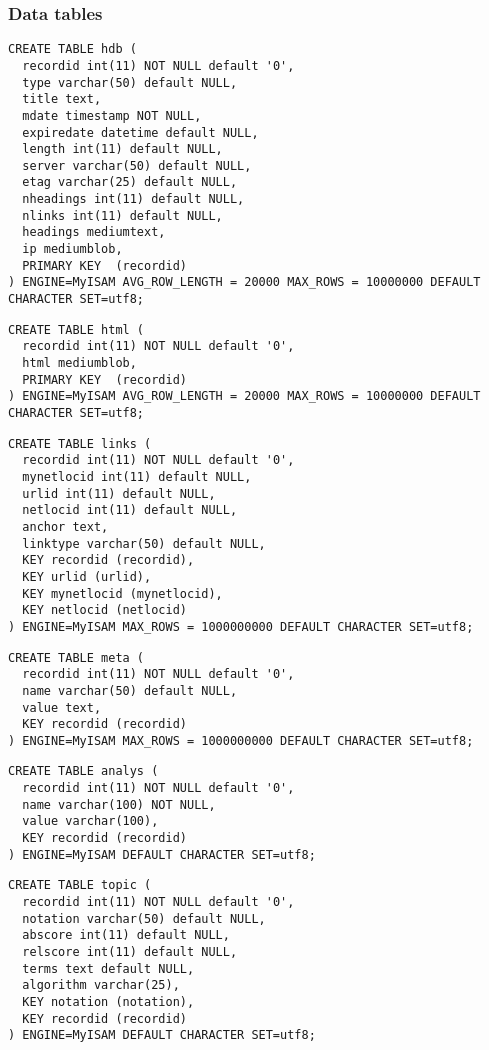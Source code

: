 \subsubsection{Data tables}
\begin{verbatim}
CREATE TABLE hdb (
  recordid int(11) NOT NULL default '0',
  type varchar(50) default NULL,
  title text,
  mdate timestamp NOT NULL,
  expiredate datetime default NULL,
  length int(11) default NULL,
  server varchar(50) default NULL,
  etag varchar(25) default NULL,
  nheadings int(11) default NULL,
  nlinks int(11) default NULL,
  headings mediumtext,
  ip mediumblob,
  PRIMARY KEY  (recordid)
) ENGINE=MyISAM AVG_ROW_LENGTH = 20000 MAX_ROWS = 10000000 DEFAULT CHARACTER SET=utf8;
\end{verbatim}

\begin{verbatim}
CREATE TABLE html (
  recordid int(11) NOT NULL default '0',
  html mediumblob,
  PRIMARY KEY  (recordid)
) ENGINE=MyISAM AVG_ROW_LENGTH = 20000 MAX_ROWS = 10000000 DEFAULT CHARACTER SET=utf8;
\end{verbatim}

\begin{verbatim}
CREATE TABLE links (
  recordid int(11) NOT NULL default '0',
  mynetlocid int(11) default NULL,
  urlid int(11) default NULL,
  netlocid int(11) default NULL,
  anchor text,
  linktype varchar(50) default NULL,
  KEY recordid (recordid),
  KEY urlid (urlid),
  KEY mynetlocid (mynetlocid),
  KEY netlocid (netlocid)
) ENGINE=MyISAM MAX_ROWS = 1000000000 DEFAULT CHARACTER SET=utf8;
\end{verbatim}

\begin{verbatim}
CREATE TABLE meta (
  recordid int(11) NOT NULL default '0',
  name varchar(50) default NULL,
  value text,
  KEY recordid (recordid)
) ENGINE=MyISAM MAX_ROWS = 1000000000 DEFAULT CHARACTER SET=utf8;
\end{verbatim}

\begin{verbatim}
CREATE TABLE analys (
  recordid int(11) NOT NULL default '0',
  name varchar(100) NOT NULL,
  value varchar(100),
  KEY recordid (recordid)
) ENGINE=MyISAM DEFAULT CHARACTER SET=utf8;
\end{verbatim}

\begin{verbatim}
CREATE TABLE topic (
  recordid int(11) NOT NULL default '0',
  notation varchar(50) default NULL,
  abscore int(11) default NULL,
  relscore int(11) default NULL,
  terms text default NULL,
  algorithm varchar(25),
  KEY notation (notation),
  KEY recordid (recordid)
) ENGINE=MyISAM DEFAULT CHARACTER SET=utf8;
\end{verbatim}

